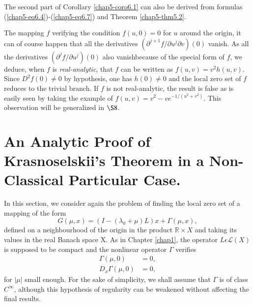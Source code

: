 \begin{remark}\label{chap5-rem6.4}
The second part of Corollary \ref{chap5-coro6.1} can also be derived
from formulas (\ref{chap5-eq6.4})-(\ref{chap5-eq6.7}) and Theorem
\ref{chap5-thm5.2}. 
\end{remark}

\begin{remark}\label{chap5-rem6.5}
The mapping $f$ verifying the condition $f(u, 0) = 0$ for $u$ around the
origin, it can of course happen that all the derivatives
$(\partial^{j+1} f/ \partial u^{j} \partial v) (0)$ vanish. As all the
derivatives $(\partial^{j} f / \partial u^{j})(0)$ also
vanish\pageoriginale because of the special form of $f$, we deduce, when
$f$ is {\em real-analytic}, that $f$ can be written as $f(u, v) =
v^{2}h(u, v)$. Since $D^{2}f(0) \neq 0$ by hypothesis, one has $h(0)
\neq 0$ and the local zero set of $f$ reduces to the trivial branch. If
$f$ is not real-analytic, the result is false as is easily seen by
taking the example of $f(u, v) = v^{2} - ve^{-1/(u^{2} +   v^{2})}$. This observation will be  generalized in $\S 8$.
\end{remark}


\section[An Analytic Proof of Krasnoselskii's Theorem....]{An Analytic Proof of Krasnoselskii's Theorem in a
  Non-Classical Particular Case.} \label{chap5-sec7}

In this section, we consider again the problem of finding the local
zero set of a mapping of the form
\begin{equation*}
G(\mu, x) = (I - (\lambda_{0} + \mu)L)x + \Gamma(\mu,
x),\tag{7.1}\label{chap5-eq7.1} 
\end{equation*}
defined on a neighbourhood of the origin in the product $\mathbb{R}
\times X$ and taking its values in the real Banach space X. As in
Chapter \ref{chap1}, the operator $L \epsilon \mathscr{L}(X)$ is
supposed to be compact and the nonlinear operator $\Gamma$ verifies
\begin{align*}
\Gamma (\mu, 0) & = 0,\tag{7.2}\label{chap5-eq7.2}\\
D_{x}\Gamma(\mu, 0) & = 0,\tag{7.3}\label{chap5-eq7.3} 
\end{align*}
for $|\mu|$ small enough. For the sake of simplicity, we shall assume
that $\Gamma$ is of class $C^{\infty}$, although this hypothesis of
regularity can be weakened without affecting the final results.

